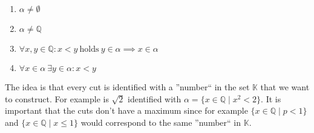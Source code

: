 \begin{enumerate}
   \item \(\alpha \neq \emptyset\)
   \item \(\alpha \neq \mathbb{Q}\)
   \item \(\forall x, y \in \mathbb{Q}: x < y~\text{holds}~y \in \alpha \implies x \in \alpha\)
   \item \(\forall x \in \alpha~\exists y \in \alpha: x < y\)
\end{enumerate}

The idea is that every cut is identified with a ''number`` in the set \(\mathbb{K}\) that we want to construct.
For example is \(\sqrt{2}\) identified with \(\alpha = \{x \in \mathbb{Q} \mid x^2 < 2\}\).
It is important that the cuts don't have a maximum since for example \(\{x \in \mathbb{Q} \mid p < 1\}\) and \(\{x \in \mathbb{Q} \mid x \leq 1\}\) would correspond to the same ''number`` in \(\mathbb{K}\).

